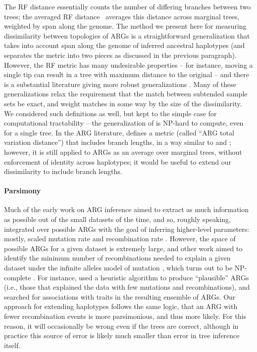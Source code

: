 \documentclass[10pt,twoside,lineno]{gsajnl}
\begin{document}
The RF distance \citep{robinson1981comparison}
essentially counts the number of differing branches between two trees;
the averaged RF distance~\citep{kuhner2015assessing}
averages this distance across marginal trees, weighted by span along the genome.
The method we present here for measuring dissimilarity between topologies of ARGs
is a straightforward generalization
that takes into account span along the genome of inferred ancestral haplotypes
(and separates the metric into two pieces as discussed in the previous paragraph).
However, the RF metric has many undesirable properties --
for instance, moving a single tip can result in a tree with maximum distance to the original --
and there is a substantial literature giving more robust generalizations
\citep[reviewed by][]{llabres2021generalized}.
Many of these generalizations \citep[e.g.,][]{bocker2013generalized}
relax the requirement that the match between subtended sample sets be exact,
and weight matches in some way by the size of the dissimilarity.
We considered such definitions as well, but kept to the simple case
for computational tractability --
the generalization of \citet{bocker2013generalized} is NP-hard to compute, even for a single tree.
In the ARG literature, \citet{zhang2023biobankscale}
defines a metric (called ``ARG total variation distance'') that includes branch lengths,
in a way similar to \citet{robinson1979comparison} and \citet{kuhner1994simulation};
however, it is still applied to ARGs as an average over marginal trees,
without enforcement of identity across haplotypes;
it would be useful to extend our dissimilarity to include branch lengths.

\paragraph{Parsimony}
Much of the early work on ARG inference aimed to extract as much information as possible
out of the small datasets of the time,
and so, roughly speaking, integrated over possible ARGs
with the goal of inferring higher-level parameters:
mostly, scaled mutation rate and recombination rate
\citep[e.g.,][]{hudson1985statistical,griffiths1996ancestral,kuhner2000maximum,stephens2000inference,fearnhead2001estimating}.
However, the space of possible ARGs for a given dataset is extremely large,
and other work aimed to identify the minimum number of recombinations
needed to explain a given dataset under the infinite alleles model of mutation
\citep[e.g.,][]{hein1990reconstructing,myers2003bounds,song2005constructing},
which turns out to be NP-complete \citep{wang2001perfect}.
For instance, \citet{minichiello2006mapping}
used a heuristic algorithm to produce ``plausible'' ARGs
(i.e., those that explained the data with few mutations and recombinations),
and searched for associations with traits in the resulting ensemble of ARGs.
Our approach for extending haplotypes follows the same logic,
that an ARG with fewer recombination events is more parsimonious,
and thus more likely.
For this reason, it will occasionally be wrong even if the trees are correct,
although in practice this source of error is likely much smaller than error in tree inference itself.
\end{document}
